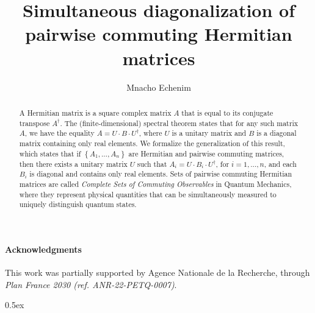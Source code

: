 \documentclass[11pt,a4paper]{article}
\newcommand{\mnset}[1]{\left\{#1\right\}}\newcommand{\set}[1]{\left\{#1\right\}}
\begin{document}
\title{Simultaneous diagonalization of pairwise commuting Hermitian matrices}
\author{Mnacho Echenim}
\maketitle

\begin{abstract}
	A Hermitian matrix is a square complex matrix $A$ that is equal to its conjugate transpose $A^\dagger$. The (finite-dimensional) spectral theorem states that for any such matrix $A$, we have the equality $A = U\cdot B\cdot U^\dagger$, where $U$ is a unitary matrix and $B$ is a diagonal matrix containing only real elements. We formalize the generalization of this result, which states that if $\mnset{A_1, \ldots, A_n}$ are Hermitian and pairwise commuting matrices, then there exists a unitary matrix $U$ such that $A_i = U\cdot B_i \cdot U^\dagger$, for $i = 1,\ldots, n$, and each $B_i$ is diagonal and contains only real elements. Sets of pairwise commuting Hermitian matrices are called \emph{Complete Sets of Commuting Observables} in Quantum Mechanics, where they represent physical quantities that can be simultaneously measured to uniquely distinguish quantum states.
\end{abstract}

\tableofcontents

\paragraph{Acknowledgments} This work was partially supported by Agence Nationale de la Recherche, through \emph{Plan France 2030 (ref. ANR-22-PETQ-0007)}.

\parindent 0pt\parskip 0.5ex



%
%
\end{document}
